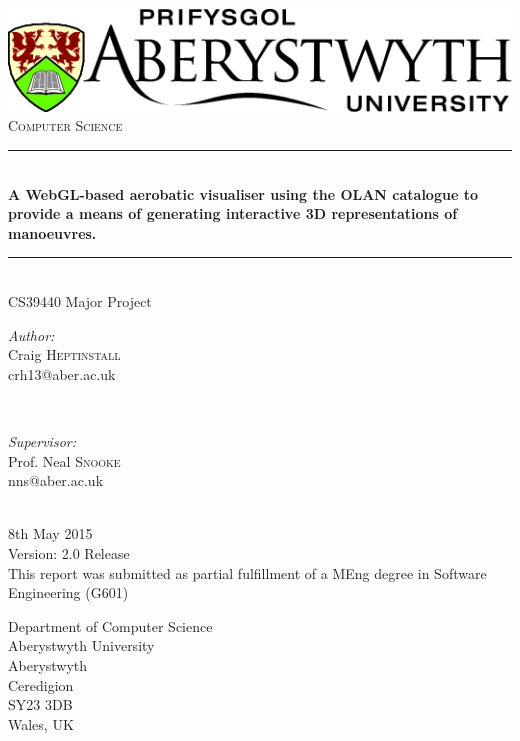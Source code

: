 \begin{titlepage}

\newcommand{\HRule}{\rule{\linewidth}{0.5mm}} %

\begin{center} %

\includegraphics[scale=0.5]{images/logo.png}\\[0.6cm] %

\textsc{\Large Computer Science}\\[0.5cm] %

\HRule \\[0.4cm]
{ \huge \bfseries A WebGL-based aerobatic visualiser using the OLAN catalogue to provide a means of generating interactive 3D representations of manoeuvres. } %
\HRule \\[0.6cm]

\huge{ CS39440 Major Project }\\[1cm]

\begin{minipage}{0.4\textwidth}
\begin{flushleft} \large
\emph{Author:}\\
Craig \textsc{Heptinstall} %
\\ crh13@aber.ac.uk
\end{flushleft}
\end{minipage}
~
\begin{minipage}{0.4\textwidth}
\begin{flushright} \large
\emph{Supervisor:} \\
Prof. Neal \textsc{Snooke} %
\\ nns@aber.ac.uk
\end{flushright}
\end{minipage}\\[1.5cm]
{\large {8th May 2015}}\\ 
{\large {Version: 2.0 Release}}\\[1cm] 
{\large{This report was submitted as partial fulfillment of a MEng degree in Software Engineering (G601)}}\\[3.2cm]

\end{center}

{\large {Department of Computer Science}}\\ 
{\large {Aberystwyth University}}\\ 
{\large {Aberystwyth}}\\ 
{\large {Ceredigion}}\\ 
{\large {SY23 3DB}}\\ 
{\large {Wales, UK}}
\end{titlepage}